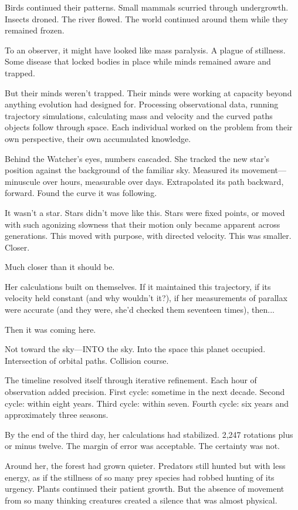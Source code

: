 Birds continued their patterns. Small mammals scurried through undergrowth. Insects droned. The river flowed. The world continued around them while they remained frozen.

To an observer, it might have looked like mass paralysis. A plague of stillness. Some disease that locked bodies in place while minds remained aware and trapped.

But their minds weren't trapped. Their minds were working at capacity beyond anything evolution had designed for. Processing observational data, running trajectory simulations, calculating mass and velocity and the curved paths objects follow through space. Each individual worked on the problem from their own perspective, their own accumulated knowledge.

Behind the Watcher's eyes, numbers cascaded. She tracked the new star's position against the background of the familiar sky. Measured its movement—minuscule over hours, measurable over days. Extrapolated its path backward, forward. Found the curve it was following.

It wasn't a star. Stars didn't move like this. Stars were fixed points, or moved with such agonizing slowness that their motion only became apparent across generations. This moved with purpose, with directed velocity. This was smaller. Closer.

Much closer than it should be.

Her calculations built on themselves. If it maintained this trajectory, if its velocity held constant (and why wouldn't it?), if her measurements of parallax were accurate (and they were, she'd checked them seventeen times), then...

Then it was coming here.

Not toward the sky—INTO the sky. Into the space this planet occupied. Intersection of orbital paths. Collision course.

The timeline resolved itself through iterative refinement. Each hour of observation added precision. First cycle: sometime in the next decade. Second cycle: within eight years. Third cycle: within seven. Fourth cycle: six years and approximately three seasons.

By the end of the third day, her calculations had stabilized. 2,247 rotations plus or minus twelve. The margin of error was acceptable. The certainty was not.

Around her, the forest had grown quieter. Predators still hunted but with less energy, as if the stillness of so many prey species had robbed hunting of its urgency. Plants continued their patient growth. But the absence of movement from so many thinking creatures created a silence that was almost physical.

